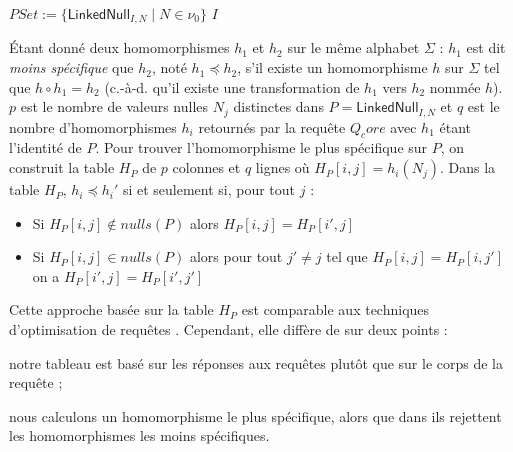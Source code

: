 \begin{algorithm}[ht]
	\caption{$\textsc{Simplify}(I, \nu_0)$}
    \label{algo:update:core}
	$PSet := \{\textsf{LinkedNull}_{I,N} \mid N \in \nu_0\}$\; \label{algo:update:core:pset}
	\Return $I$\;
\end{algorithm}

Étant donné deux homomorphismes $h_1$ et $h_2$ sur le même alphabet $\Sigma$ : $h_1$ est dit \textit{moins spécifique} que $h_2$, noté $h_1 \preceq h_2$, s'il existe un homomorphisme $h$ sur $\Sigma$ tel que $h \circ h_1 = h_2$ (c.-à-d. qu'il existe une transformation de $h_1$ vers $h_2$ nommée $h$).
$p$ est le nombre de valeurs nulles $N_j$ distinctes dans $P = \textsf{LinkedNull}_{I,N}$ et $q$ est le nombre d'homomorphismes $h_i$ retournés par la requête $Q_core$ avec $h_1$ étant l'identité de $P$.
Pour trouver l'homomorphisme le plus spécifique sur $P$, on construit la table $H_P$ de $p$ colonnes et $q$ lignes où $H_P[i, j] = h_i(N_j)$.
Dans la table $H_P$, $h_i \preceq h_i'$ si et seulement si, pour tout $j$ :

\begin{itemize}
	\item Si $H_P[i, j] \notin nulls(P)$ alors $H_P[i, j] = H_P[i', j]$
	\item Si $H_P[i, j] \in nulls(P)$ alors pour tout $j' \neq j$ tel que $H_P[i, j] = H_P[i, j']$ on a $H_P[i', j] = H_P[i', j']$
\end{itemize}

\begin{example}
	
\end{example}

Cette approche basée sur la table $H_P $ est comparable aux techniques d'optimisation de requêtes \cite{}.
Cependant, elle diffère de \cite{ahoEfficientOptimizationClass1979,chandraOptimalImplementationConjunctive1977} sur deux points :
\begin{enumerate*}[label=(\roman*)]
	\item notre tableau est basé sur les réponses aux requêtes plutôt que sur le corps de la requête ;
	\item nous calculons un homomorphisme le plus spécifique, alors que dans \cite{ahoEfficientOptimizationClass1979} ils rejettent les homomorphismes les moins spécifiques.
\end{enumerate*}
